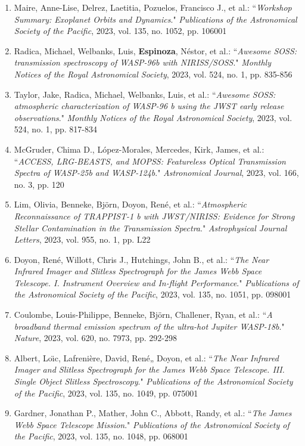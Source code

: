 \documentclass[12pt, a4paper]{article} %
\begin{document}
\begin{flushleft}
\begin{enumerate}
\item Maire, Anne-Lise, Delrez, Laetitia, Pozuelos, Francisco J., et al.: ``\textit{Workshop Summary: Exoplanet Orbits and Dynamics}." \textit{Publications of the Astronomical Society of the Pacific}, 2023, vol. 135, no. 1052, pp. 106001
\item Radica, Michael, Welbanks, Luis, \textbf{Espinoza}, Néstor, et al.: ``\textit{Awesome SOSS: transmission spectroscopy of WASP-96b with NIRISS/SOSS}." \textit{Monthly Notices of the Royal Astronomical Society}, 2023, vol. 524, no. 1, pp. 835-856
\item Taylor, Jake, Radica, Michael, Welbanks, Luis, et al.: ``\textit{Awesome SOSS: atmospheric characterization of WASP-96 b using the JWST early release observations}." \textit{Monthly Notices of the Royal Astronomical Society}, 2023, vol. 524, no. 1, pp. 817-834
\item McGruder, Chima D., López-Morales, Mercedes, Kirk, James, et al.: ``\textit{ACCESS, LRG-BEASTS, and MOPSS: Featureless Optical Transmission Spectra of WASP-25b and WASP-124b}." \textit{Astronomical Journal}, 2023, vol. 166, no. 3, pp. 120
\item Lim, Olivia, Benneke, Björn, Doyon, René, et al.: ``\textit{Atmospheric Reconnaissance of TRAPPIST-1 b with JWST/NIRISS: Evidence for Strong Stellar Contamination in the Transmission Spectra}." \textit{Astrophysical Journal Letters}, 2023, vol. 955, no. 1, pp. L22
\item Doyon, René, Willott, Chris J., Hutchings, John B., et al.: ``\textit{The Near Infrared Imager and Slitless Spectrograph for the James Webb Space Telescope. I. Instrument Overview and In-flight Performance}." \textit{Publications of the Astronomical Society of the Pacific}, 2023, vol. 135, no. 1051, pp. 098001
\item Coulombe, Louis-Philippe, Benneke, Björn, Challener, Ryan, et al.: ``\textit{A broadband thermal emission spectrum of the ultra-hot Jupiter WASP-18b}." \textit{Nature}, 2023, vol. 620, no. 7973, pp. 292-298
\item Albert, Loı̈c, Lafrenière, David, René„ Doyon, et al.: ``\textit{The Near Infrared Imager and Slitless Spectrograph for the James Webb Space Telescope. III. Single Object Slitless Spectroscopy}." \textit{Publications of the Astronomical Society of the Pacific}, 2023, vol. 135, no. 1049, pp. 075001
\item Gardner, Jonathan P., Mather, John C., Abbott, Randy, et al.: ``\textit{The James Webb Space Telescope Mission}." \textit{Publications of the Astronomical Society of the Pacific}, 2023, vol. 135, no. 1048, pp. 068001

\end{enumerate}
\end{flushleft}
\end{document}
